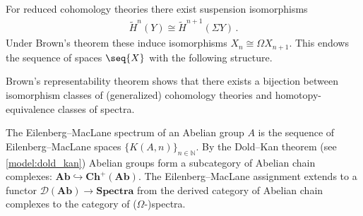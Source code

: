     For reduced cohomology theories there exist suspension isomorphisms
    \begin{gather}
        \widetilde{H}^n(Y)\cong\widetilde{H}^{n+1}(\Sigma Y)\,.
    \end{gather}
    Under Brown's theorem these induce isomorphisms $X_n\cong\Omega X_{n+1}$. This endows the sequence of spaces $\seq{X}$ with the following structure.
    \begin{property}
        Brown's representability theorem shows that there exists a bijection between isomorphism classes of (generalized) cohomology theories and homotopy-equivalence classes of spectra.
    \end{property}

    \begin{property}
        The Eilenberg--MacLane spectrum of an Abelian group $A$ is the sequence of Eilenberg--MacLane spaces $\{K(A,n)\}_{n\in\mathbb{N}}$. By the Dold--Kan theorem (see \cref{model:dold_kan}) Abelian groups form a subcategory of Abelian chain complexes: $\mathbf{Ab}\hookrightarrow\mathbf{Ch}^+(\mathbf{Ab})$. The Eilenberg--MacLane assignment extends to a functor $\mathcal{D}(\mathbf{Ab})\rightarrow\mathbf{Spectra}$ from the derived category of Abelian chain complexes to the category of ($\Omega$-)spectra.
    \end{property}

